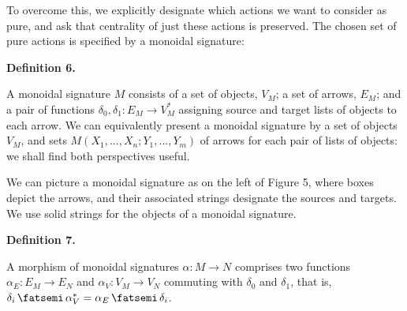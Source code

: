 \documentclass[10pt,a4paper]{article}
\begin{document}
 
 
To overcome this, we explicitly designate which actions we want to consider as pure, and ask that centrality of just these actions is preserved. The chosen set of pure actions is specified by a monoidal signature:\par
 
 
 
\par\medskip\noindent\textbf{Definition 6.}\par
 
 
A monoidal signature $M$ consists of a set of objects, $V_{M}$; a set of arrows, $E_{M}$; and a pair of functions $\delta_{0},\delta_{1}:E_{M}\to V_{M}^{*}$ assigning source and target lists of objects to each arrow. We can equivalently present a monoidal signature by a set of objects $V_{M}$, and sets $M(X_{1},...,X_{n};Y_{1},...,Y_{m})$ of arrows for each pair of lists of objects: we shall find both perspectives useful.\par
 
 
 
 
We can picture a monoidal signature as on the left of Figure 5, where boxes depict the arrows, and their associated strings designate the sources and targets. We use solid strings for the objects of a monoidal signature.\par
 
 
 
\par\medskip\noindent\textbf{Definition 7.}\par
 
 
A morphism of monoidal signatures $\alpha:M\to N$ comprises two functions $\alpha_{E}:E_{M}\to E_{N}$ and $\alpha_{V}:V_{M}\to V_{N}$ commuting with $\delta_{0}$ and $\delta_{1}$, that is, $\delta_{i}\mathop{\fatsemi}\alpha_{V}^{*}=\alpha_{E}\mathop{\fatsemi}\delta_{i}$.\par
 
 
 
\end{document}
